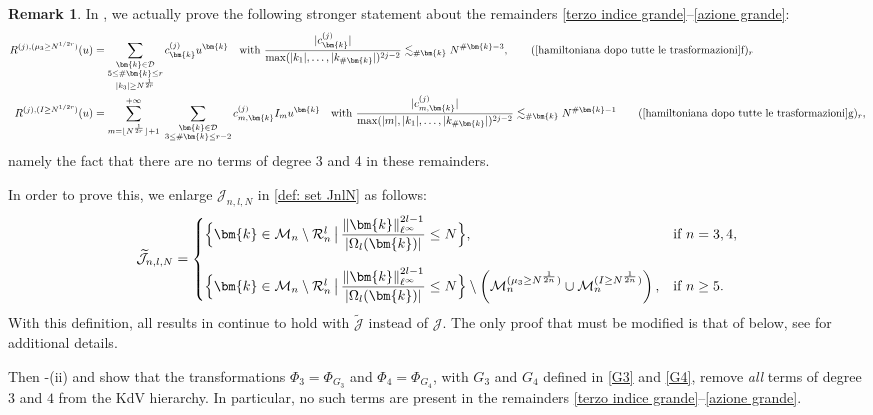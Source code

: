 \documentclass[a4paper,10pt,reqno]{article}
\theoremstyle{definition}
\theoremstyle{plain}
\theoremstyle{plain}
\theoremstyle{definition}
\theoremstyle{plain}
\theoremstyle{plain}
\theoremstyle{plain}
\theoremstyle{definition}
\newtheorem{rem}[definition]{Remark}
\theoremstyle{definition}
\newcommand{\norm}[1]{\left\lVert #1 \right\rVert}
\def \M{\mathcal{M}}
\def \J{\mathcal{J}}
\def \k{\bm{k}}
\begin{document}
\begin{rem} \label{rmk: improved normal form}
In , we actually prove the following stronger statement about the remainders \ref{terzo indice grande}--\ref{azione grande}:
 \begin{align}
    R^{(j),(\mu_3 \ge N^{1/2r})}(u) &= \sum_{ \substack{ \k \in \mathcal{D} \\ 5 \le \#\k \le r \\ |k_3| \ge N^{\frac{1}{2r}}} } c_{\k}^{(j)} u^{\k} \quad \text{with $\frac{|c_{\k}^{(j)}|}{\max ( |k_1|,\ldots,|k_{\#\k}| )^{2j-2} } \lesssim_{\#\k} N^{\#\k-3}$}, \tag*{(\ref{hamiltoniana dopo tutte le trasformazioni}f)$_r$}  \\
    R^{(j),(I \ge N^{1/2r})}(u) &= \sum_{m = \lfloor N^{\frac{1}{2r}} \rfloor + 1}^{+\infty} \, \, \sum_{ \substack{ \k \in \mathcal{D} \\ 3 \le \#\k \le r-2} } c_{m,\k}^{(j)} I_m u^{\k} \quad \text{with $\frac{|c_{m,\k}^{(j)}|}{\max ( |m|,|k_1|,\ldots,|k_{\#\k}| )^{2j-2} } \lesssim_{\#\k} N^{\#\k-1}$} \tag*{(\ref{hamiltoniana dopo tutte le trasformazioni}g)$_r$},
\end{align}
namely the fact that there are no terms of degree 3 and 4 in these remainders. 

In order to prove this, we enlarge $\J_{n,l,N}$ in \eqref{def: set JnlN} as follows:
\begin{equation}\label{def: set tildeJnlN}
\widetilde{\mathcal{J}}_{n,l,N} = 
\begin{cases}
\Big \{ \k\in \M_n \setminus \mathcal{R}_n^l \, \big | \, \dfrac{\norm{\k}_{\ell^{\infty}}^{2l-1}}{|\Omega_l(\k)|}  \le N \Big \}, & \text{if $n=3,4,$} \\ 
\vspace{-0.1cm} \\
\Big \{ \k \in \M_n \setminus \mathcal{R}_n^l \, \big | \, \dfrac{\norm{\k}_{\ell^{\infty}}^{2l-1}}{|\Omega_l(\k)|} \le N \Big \} \setminus \left (  \M_n^{(\mu_3 \ge N^{\frac{1}{2n}})} \cup \M_n^{(I \ge N^{\frac{1}{2n}})} \right ), & \text{if $n \ge 5$.}
\end{cases}
\end{equation}
With this definition, all results in  continue to hold with $\widetilde{\mathcal{J}}$ instead of $\J$. The only proof that must be modified is that of  below, see  for additional details.

Then -(ii) and  show that the transformations $\Phi_3=\Phi_{G_3}$ and $\Phi_4=\Phi_{G_4}$, with $G_3$ and $G_4$ defined in \eqref{G3} and \eqref{G4}, remove \emph{all} terms of degree $3$ and $4$ from the KdV hierarchy. In particular, no such terms are present in the remainders \ref{terzo indice grande}--\ref{azione grande}.
\end{rem}
\end{document}
